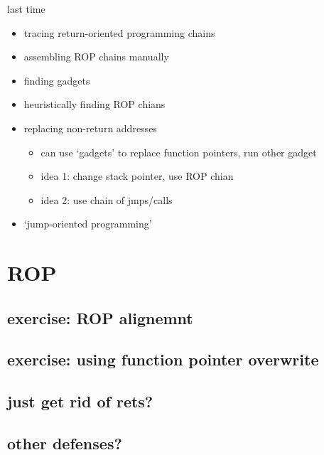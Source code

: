 \date{}
\title{}
\date{}

\begin{frame}
    \titlepage
\end{frame}


\usetikzlibrary{arrows.meta,patterns}

\begin{frame}{last time}
    \begin{itemize}
    \item tracing return-oriented programming chains
    \item assembling ROP chains manually
    \item finding gadgets
    \item heuristically finding ROP chians
    \item replacing non-return addresses
        \begin{itemize}
        \item can use `gadgets' to replace function pointers, run other gadget
        \item idea 1: change stack pointer, use ROP chian
        \item idea 2: use chain of jmps/calls
        \end{itemize}
    \item `jump-oriented programming'
    \end{itemize}
\end{frame}

\section{ROP}
\subsection{exercise: ROP alignemnt}


\subsection{exercise: using function pointer overwrite}


\subsection{just get rid of rets?}


\subsection{other defenses?}



